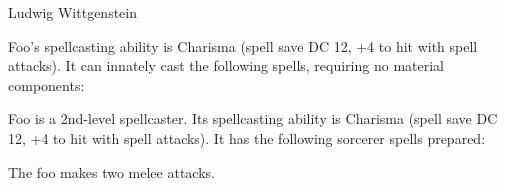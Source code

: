 \documentclass[letterpaper,twocolumn,openany,nodeprecatedcode]{dndbook}
\begin{document}
\begin{DndMonster}[float*=b,width=\textwidth + 8pt]{Ludwig Wittgenstein}
  \begin{multicols}{2}

    \DndMonsterBasics[
        armor-class = {9 (12 with \emph{mage armor})},
        hit-points  = {\DndDice{3d8 + 3}},
        speed       = {30 ft., fly 30 ft.},
      ]

    \DndMonsterAbilityScores[
        str = 12,
        dex = 8,
        con = 13,
        int = 10,
        wis = 14,
        cha = 15,
      ]

    \DndMonsterDetails[
        senses = {darkvision 60 ft., passive Perception 10},
        languages = {Common, Goblin, Undercommon},
        challenge = 1,
      ]
    Foo's spellcasting ability is Charisma (spell save DC 12, +4 to hit with spell attacks). It can innately cast the following spells, requiring no material components:
    \begin{DndMonsterSpells}
    \end{DndMonsterSpells}

    Foo is a 2nd-level spellcaster. Its spellcasting ability is Charisma (spell save DC 12, +4 to hit with spell attacks). It has the following sorcerer spells prepared:
    \begin{DndMonsterSpells}
    \end{DndMonsterSpells}

    The foo makes two melee attacks.


\end{multicols}
\end{DndMonster}
\end{document}
